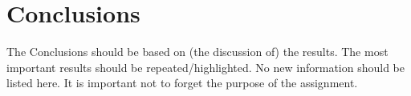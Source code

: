 \chapter{Conclusions}

The Conclusions should be based on (the discussion of) the results. The most important results should be repeated/highlighted. No new information should be listed here. It is important not to forget the purpose of the assignment.

